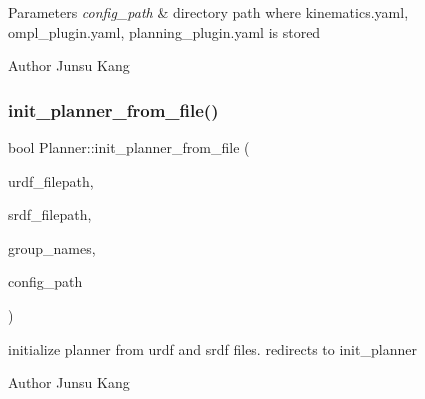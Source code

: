 \begin{DoxyParams}{Parameters}
{\em config\+\_\+path} & directory path where kinematics.\+yaml, ompl\+\_\+plugin.\+yaml, planning\+\_\+plugin.\+yaml is stored \\
\hline
\end{DoxyParams}
\begin{DoxyAuthor}{Author}
Junsu Kang 
\end{DoxyAuthor}
\mbox{\label{class_r_n_b_1_1_moveit_compact_1_1_planner_ae7acfa0a899d0c692e6f01701e1c360d}} 
\subsubsection{\texorpdfstring{init\+\_\+planner\+\_\+from\+\_\+file()}{init\_planner\_from\_file()}}
{\footnotesize\ttfamily bool Planner\+::init\+\_\+planner\+\_\+from\+\_\+file (\begin{DoxyParamCaption}\item[{string}]{urdf\+\_\+filepath,  }\item[{string}]{srdf\+\_\+filepath,  }\item[{Name\+List \&}]{group\+\_\+names,  }\item[{string}]{config\+\_\+path }\end{DoxyParamCaption})}



initialize planner from urdf and srdf files. redirects to init\+\_\+planner 

\begin{DoxyAuthor}{Author}
Junsu Kang 
\end{DoxyAuthor}
\mbox{\label{class_r_n_b_1_1_moveit_compact_1_1_planner_a8600287d3616809c9587ce6e5bfe1861}} 
